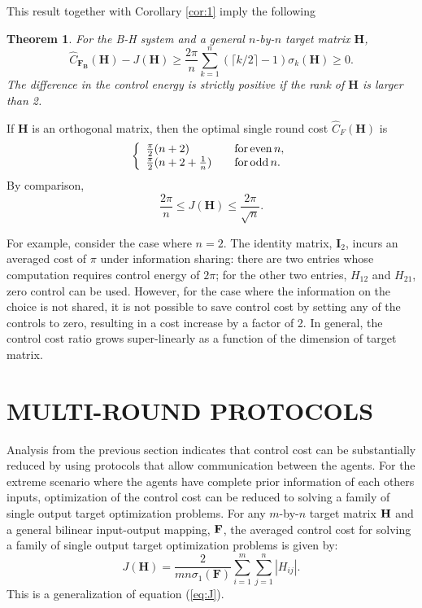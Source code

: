 \documentclass[12pt,onecolumn,draftcls]{IEEEtran}
\newcommand{\bB}{\mathbf{B}}
\newcommand{\bF}{\mathbf{F}}
\newcommand{\bH}{\mathbf{H}}
\newtheorem{theorem}{Theorem}[section]
\begin{document}
This result together with Corollary \ref{cor:1} imply the following
\begin{theorem}
For the B-H system and a general $n$-by-$n$ target matrix $\mathbf{H}$,
\begin{equation}
\hat{C}_{\bF_\bB}(\mathbf{H})- J(\mathbf{H}) \geq  \frac{2\pi}{n}  \sum_{k=1}^{n} (\lceil k/2 \rceil -1) \sigma_{k}(\mathbf{H}) \geq 0.
\end{equation}
The difference in the control energy is strictly positive if the rank of $\mathbf{H}$ is larger than 2.
\end{theorem}

If $\mathbf{H}$ is an orthogonal matrix, then the optimal single round cost $\hat{C}_F(\mathbf{H})$ is
\begin{equation}
\left\{
\begin{array}{lll}
\frac{\pi}{2} (n+2) & & {\rm for \, even \,} n,\\
\frac{\pi}{2}(n+2+\frac{1}{n}) & & {\rm for \, odd \,} n.
\end{array}
\right.
\end{equation}
By comparison,
\begin{equation}
\frac{2\pi}{n} \leq J(\mathbf{H}) \leq \frac{2\pi}{\sqrt{n}}.
\end{equation}

For example, consider the case where $n=2$.  The
identity matrix, $\mathbf{I}_2$, incurs an averaged cost of $\pi$ under information sharing:
there are two entries whose computation requires control energy of $2\pi$; for the other
two entries, $H_{12}$ and $H_{21}$, zero control can be used.
However, for the case where the information on the choice is not shared,
it is not possible to save control cost by setting any of the controls to zero, resulting in a cost increase by a factor of 2.
In general, the control cost ratio grows super-linearly as a function of the dimension of target matrix.

\section{MULTI-ROUND PROTOCOLS}\setcounter{equation}{0}

Analysis from the previous section indicates that control cost can be substantially reduced by using protocols that allow communication between the agents.   For the extreme scenario where the agents have complete prior information of
each others inputs, optimization of the control cost can be reduced to solving a family of single output target optimization
problems.  For any $m$-by-$n$ target matrix $\bf H$ and a general bilinear
input-output mapping, $\bf F$, the averaged control cost for solving a family of single
output target optimization problems is given by:
\begin{equation}
J(\bH)=\frac{2}{mn\sigma_{1}(\mathbf{F})} \sum_{i=1}^{m} \sum_{j=1}^{n} |H_{ij}|.
\label{eq:cost}
\end{equation}
This is a generalization of equation (\ref{eq:J}).
\end{document}
